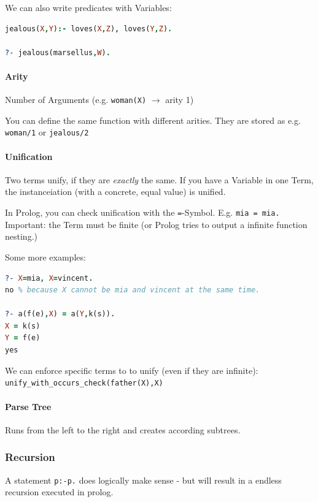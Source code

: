 We can also write predicates with Variables: 
\begin{lstlisting}[language=Prolog]
jealous(X,Y):- loves(X,Z), loves(Y,Z).

?- jealous(marsellus,W).
\end{lstlisting}

\paragraph{Arity}

Number of Arguments (e.g. \lstinline|woman(X)| $\rightarrow$ arity 1)

You can define the same function with different arities. They are stored as e.g. \lstinline|woman/1| or \lstinline|jealous/2|

\paragraph{Unification}

Two terms unify, if they are \emph{exactly} the same. If you have a Variable in one Term, the instanceiation (with a concrete, equal value) is unified.

In Prolog, you can check unification with the \lstinline|=|-Symbol. E.g. \lstinline|mia = mia.| Important: the Term must be finite (or Prolog tries to output a infinite function nesting.)

Some more examples:
\begin{lstlisting}[language=Prolog]
?- X=mia, X=vincent.
no % because X cannot be mia and vincent at the same time.

?- a(f(e),X) = a(Y,k(s)).
X = k(s)
Y = f(e)
yes
\end{lstlisting}

We can enforce specific terms to to unify (even if they are infinite):
\lstinline|unify_with_occurs_check(father(X),X)|

\paragraph{Parse Tree}

Runs from the left to the right and creates according subtrees.


\subsubsection{Recursion}

A statement \lstinline|p:-p.| does logically make sense - but will result in a endless recursion executed in prolog.


